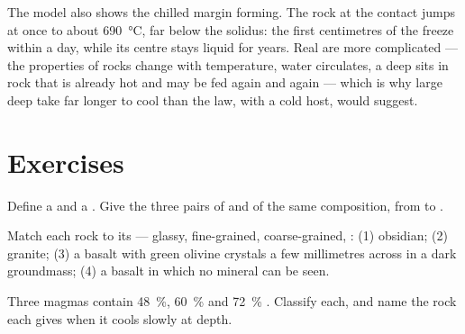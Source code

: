 The model also shows the chilled margin forming. The rock at the contact
jumps at once to about \qty{690}{\degreeCelsius}, far below the solidus: the
first centimetres of the  freeze within a day, while its centre stays
liquid for years. Real  are more complicated --- the properties of
rocks change with temperature, water circulates, a deep  sits in rock
that is already hot and may be fed again and again --- which is why large
deep  take far longer to cool than the law, with a cold host, would
suggest.

\section{Exercises}

\begin{exercise}[$\star$]\label{exo:g11:igneous-rocks:1}
Define a  and a . Give the three pairs of
 and  of the same composition, from  to .
\end{exercise}

\begin{exercise}[$\star$]\label{exo:g11:igneous-rocks:2}
Match each rock to its  --- glassy, fine-grained, coarse-grained,
: (1) obsidian; (2) granite; (3) a basalt with green olivine
crystals a few millimetres across in a dark groundmass; (4) a basalt in which
no mineral can be seen.
\end{exercise}

\begin{exercise}[$\star$]\label{exo:g11:igneous-rocks:3}
Three magmas contain \qty{48}{\percent}, \qty{60}{\percent} and
\qty{72}{\percent} . Classify each, and name the rock each gives
when it cools slowly at depth.
\end{exercise}

